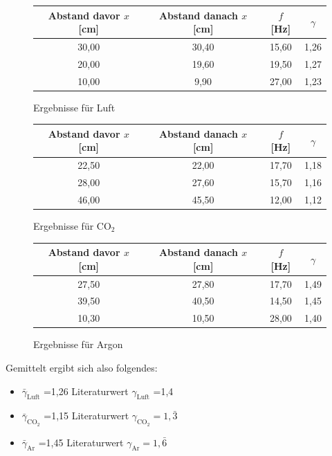 \documentclass[fontsize=12pt]{scrartcl}
\begin{document}
\begin{figure}[H]
\centering
\caption{Ergebnisse für Luft}
\begin{tabular}{|c|c|c|c|} \hline
Abstand davor $x$ [cm]	& Abstand danach $x$ [cm] & $f$ [Hz] & $\gamma$ \\ \hline
30,00&	30,40&	15,60&	1,26	 \\ \hline
20,00&	19,60&	19,50&	1,27	\\ \hline
10,00&	9,90&	27,00&		1,23 	\\ \hline
\end{tabular}				 
\end{figure}
\begin{figure}[H]
\vspace{-24pt}
\centering
\caption{Ergebnisse für CO$_2$}
\begin{tabular}{|c|c|c|c|} \hline
Abstand davor $x$ [cm]	& Abstand danach $x$ [cm] & $f$ [Hz] & $\gamma$\\ \hline
22,50&	22,00&	17,70&	1,18	\\ \hline
28,00&	27,60&	15,70&	1,16	\\ \hline
46,00&	45,50&	12,00&	1,12	\\ \hline
\end{tabular}				 
\end{figure}
\begin{figure}[H]
\vspace{-24pt}
\centering
\caption{Ergebnisse für Argon}
\begin{tabular}{|c|c|c|c|} \hline
Abstand davor $x$ [cm]	& Abstand danach $x$ [cm] & $f$ [Hz] & $\gamma$\\ \hline
27,50&	27,80&	17,70	& 1,49	\\ \hline
39,50&	40,50&	14,50	&	1,45 \\ \hline
10,30&	10,50&	28,00	&	1,40 \\ \hline
\end{tabular}				 
\end{figure}

Gemittelt ergibt sich also folgendes:
\begin{itemize}
\centering
\item[] $\bar{\gamma}_{\text{Luft}}$ =1,26 \hspace{50pt} Literaturwert $\gamma_{\text{Luft}}$ =1,4
\item[] $\bar{\gamma}_{\text{CO}_2}$ =1,15 \hspace{50pt} Literaturwert $\gamma_{\text{CO}_2} =1,\bar{3}$
\item[] $\bar{\gamma}_{\text{Ar}}$ =1,45 \hspace{50pt} Literaturwert $\gamma_{\text{Ar}} =1,\bar{6}$
\end{itemize}
\end{document}
